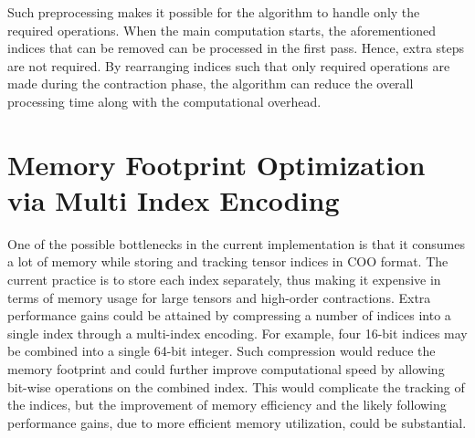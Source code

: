 \noindent
Such preprocessing makes it possible for the algorithm to handle only the required operations.
When the main computation starts, the aforementioned indices that can be removed can be
processed in the first pass. Hence, extra steps are not required. By rearranging indices
such that only required operations are made during the contraction phase, the algorithm can
reduce the overall processing time along with the computational overhead.

\section{Memory Footprint Optimization via Multi Index Encoding}
One of the possible bottlenecks in the current implementation is that it consumes a lot of
memory while storing and tracking tensor indices in COO format. The current practice is to
store each index separately, thus making it expensive in terms of memory usage for large
tensors and high-order contractions. Extra performance gains could be attained by compressing
a number of indices into a single index through a multi-index encoding. For example, four
16-bit indices may be combined into a single 64-bit integer. Such compression would reduce
the memory footprint and could further improve computational speed by allowing bit-wise
operations on the combined index. This would complicate the tracking of the indices, but the
improvement of memory efficiency and the likely following performance gains, due to more efficient
memory utilization, could be substantial.